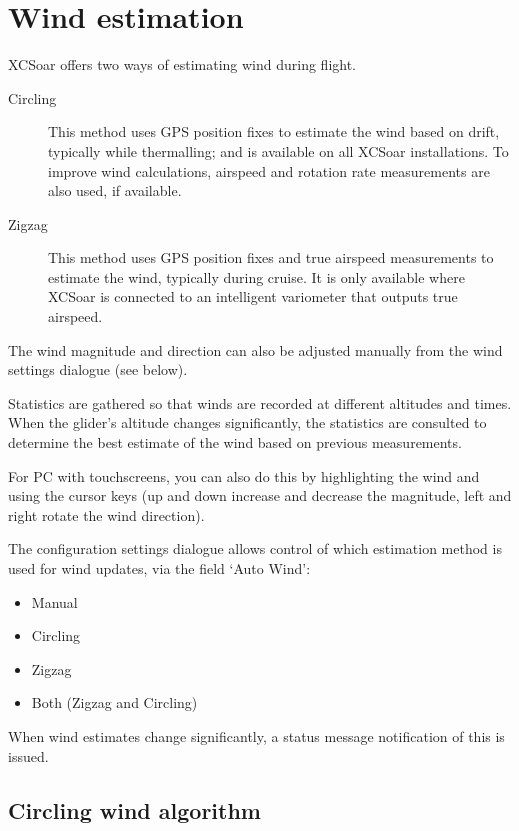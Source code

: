 \section{Wind estimation}\label{sec:wind-estimation}

XCSoar offers two ways of estimating wind during flight.
\begin{description}
\item[Circling]  This method uses GPS position fixes to estimate the wind
  based on drift, typically while thermalling; and is available on all
  XCSoar installations.
  To improve wind calculations, airspeed and rotation rate measurements are
  also used, if available.
\item[Zigzag]  This method uses GPS position fixes and true airspeed measurements
  to estimate the wind, typically during cruise.  It is only available where
  XCSoar is connected to an intelligent variometer that outputs true airspeed.
\end{description}

The wind magnitude and direction can also be adjusted manually from the
wind settings dialogue (see below).  

Statistics are gathered so that winds are recorded at different
altitudes and times.  When the glider's altitude changes significantly,
the statistics are consulted to determine the best estimate of the
wind based on previous measurements.

For PC with touchscreens, you can
also do this by highlighting the wind {\InfoBox} and using the cursor
keys (up and down increase and decrease the magnitude, left and right
rotate the wind direction).

The configuration  settings dialogue allows control of which
estimation method is used for wind updates, via the field `Auto Wind':
\begin{itemize}
\item Manual
\item Circling
\item Zigzag
\item Both (Zigzag and Circling)
\end{itemize}

When wind estimates change significantly, a status message
notification of this is issued.

\subsection*{Circling wind algorithm}

